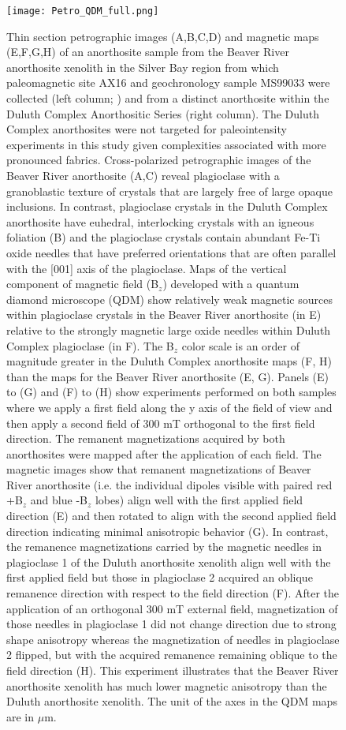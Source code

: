 \documentclass[9pt,twocolumn,twoside,lineno]{pnas-new}
\begin{document}
\begin{figure}
\centering
\noindent\texttt{[image: Petro\_QDM\_full.png]}
\caption{\footnotesize{Thin section petrographic images (A,B,C,D) and magnetic maps (E,F,G,H) of an anorthosite sample from the Beaver River anorthosite xenolith in the Silver Bay region from which paleomagnetic site AX16 and geochronology sample MS99033 were collected (left column;  \citealp{Zhang2021b}) and from a distinct anorthosite within the Duluth Complex Anorthositic Series (right column). The Duluth Complex anorthosites were not targeted for paleointensity experiments in this study given complexities associated with more pronounced fabrics. Cross-polarized petrographic images of the Beaver River anorthosite (A,C) reveal plagioclase with a granoblastic texture of crystals that are largely free of large opaque inclusions. In contrast, plagioclase crystals in the Duluth Complex anorthosite have euhedral, interlocking crystals with an igneous foliation (B) and the plagioclase crystals contain abundant Fe-Ti oxide needles that have preferred orientations that are often parallel with the [001] axis of the plagioclase. Maps of the vertical component of magnetic field (B$_z$) developed with a quantum diamond microscope (QDM) show relatively weak magnetic sources within plagioclase crystals in the Beaver River anorthosite (in E) relative to the strongly magnetic large oxide needles within Duluth Complex plagioclase (in F). The B$_z$ color scale is an order of magnitude greater in the Duluth Complex anorthosite maps (F, H) than the maps for the Beaver River anorthosite (E, G). Panels (E) to (G) and (F) to (H) show experiments performed on both samples where we apply a first field along the y axis of the field of view and then apply a second field of 300 mT orthogonal to the first field direction. The remanent magnetizations acquired by both anorthosites were mapped after the application of each field. The magnetic images show that remanent magnetizations of Beaver River anorthosite (i.e. the individual dipoles visible with paired red +B$_z$ and blue -B$_z$ lobes) align well with the first applied field direction (E) and then rotated to align with the second applied field direction indicating minimal anisotropic behavior (G). In contrast, the remanence magnetizations carried by the magnetic needles in plagioclase 1 of the Duluth anorthosite xenolith align well with the first applied field but those in plagioclase 2 acquired an oblique remanence direction with respect to the field direction (F). After the application of an orthogonal 300 mT external field, magnetization of those needles in plagioclase 1 did not change direction due to strong shape anisotropy whereas the magnetization of needles in plagioclase 2 flipped, but with the acquired remanence remaining oblique to the field direction (H). This experiment illustrates that the Beaver River anorthosite xenolith has much lower magnetic anisotropy than the Duluth anorthosite xenolith. The unit of the axes in the QDM maps are in $\mu$m.}}
\label{fig:Petro_QDM}
\end{figure}
\end{document}
